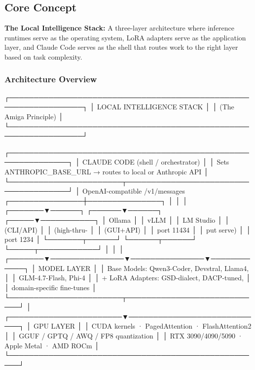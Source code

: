 \documentclass[11pt,letterpaper]{article}
\begin{document}
\subsection{Core Concept}

\textbf{The Local Intelligence Stack:} A three-layer architecture where inference runtimes serve as the operating system, LoRA adapters serve as the application layer, and Claude Code serves as the shell that routes work to the right layer based on task complexity.

\subsubsection{Architecture Overview}

\begin{asciibox}
┌─────────────────────────────────────────────────────────────────┐
│                    LOCAL INTELLIGENCE STACK                      │
│                     (The Amiga Principle)                        │
└─────────────────────────────────────────────────────────────────┘

  ┌──────────────────────────────────────────────────────────────┐
  │  CLAUDE CODE (shell / orchestrator)                          │
  │  Sets ANTHROPIC_BASE_URL → routes to local or Anthropic API  │
  └───────────────────────┬──────────────────────────────────────┘
                          │ OpenAI-compatible /v1/messages
          ┌───────────────┼───────────────┐
          │               │               │
  ┌───────▼──────┐ ┌──────▼──────┐ ┌─────▼───────────┐
  │    Ollama    │ │    vLLM     │ │   LM Studio      │
  │  (CLI/API)   │ │ (high-thru- │ │   (GUI+API)      │
  │  port 11434  │ │  put serve) │ │  port 1234       │
  └───────┬──────┘ └──────┬──────┘ └─────┬────────────┘
          │               │               │
  ┌───────▼───────────────▼───────────────▼────────────┐
  │              MODEL LAYER                            │
  │  Base Models: Qwen3-Coder, Devstral, Llama4,       │
  │               GLM-4.7-Flash, Phi-4                  │
  │  + LoRA Adapters: GSD-dialect, DACP-tuned,         │
  │                   domain-specific fine-tunes        │
  └───────────────────────┬────────────────────────────┘
                          │
  ┌───────────────────────▼────────────────────────────┐
  │              GPU LAYER                              │
  │  CUDA kernels · PagedAttention · FlashAttention2   │
  │  GGUF / GPTQ / AWQ / FP8 quantization              │
  │  RTX 3090/4090/5090 · Apple Metal · AMD ROCm       │
  └────────────────────────────────────────────────────┘
\end{asciibox}
\end{document}
